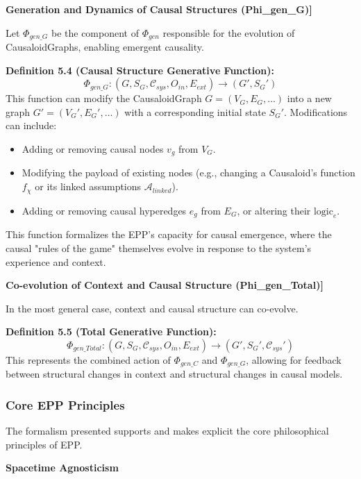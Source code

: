 \textbf{Generation and Dynamics of Causal Structures (Phi\_gen\_G)]}

        
        Let \(\Phi_{gen\_G}\) be the component of \(\Phi_{gen}\) responsible for the evolution of CausaloidGraphs, enabling emergent causality.

        \textbf{Definition 5.4 (Causal Structure Generative Function):}
        \[ \Phi_{gen\_G} : (G, S_G, \mathcal{C}_{sys}, O_{in}, E_{ext}) \to (G', S_G') \]
        This function can modify the CausaloidGraph \(G=(V_G, E_G, \dots)\) into a new graph \(G'=(V_G', E_G', \dots)\) with a corresponding initial state \(S_G'\). Modifications can include:
        \begin{itemize}
            \item Adding or removing causal nodes \(v_g\) from \(V_G\).
            \item Modifying the payload of existing nodes (e.g., changing a Causaloid's function \(f_\chi\) or its linked assumptions \(\mathcal{A}_{linked}\)).
            \item Adding or removing causal hyperedges \(e_g\) from \(E_G\), or altering their \(\text{logic}_e\).
        \end{itemize}
        This function formalizes the EPP's capacity for causal emergence, where the causal "rules of the game" themselves evolve in response to the system's experience and context.

        
\textbf{Co-evolution of Context and Causal Structure (Phi\_gen\_Total)]}
        
        In the most general case, context and causal structure can co-evolve.
        
        \textbf{Definition 5.5 (Total Generative Function):}
        \[ \Phi_{gen\_Total} : (G, S_G, \mathcal{C}_{sys}, O_{in}, E_{ext}) \to (G', S_G', \mathcal{C}_{sys}') \]
        This represents the combined action of \(\Phi_{gen\_C}\) and \(\Phi_{gen\_G}\), allowing for feedback between structural changes in context and structural changes in causal models.

\subsubsection[Core EPP Principles]{Core EPP Principles}
\label{ssec:epp_principles_formal_merged} %

    The formalism presented supports and makes explicit the core philosophical principles of EPP.

\textbf{Spacetime Agnosticism}

